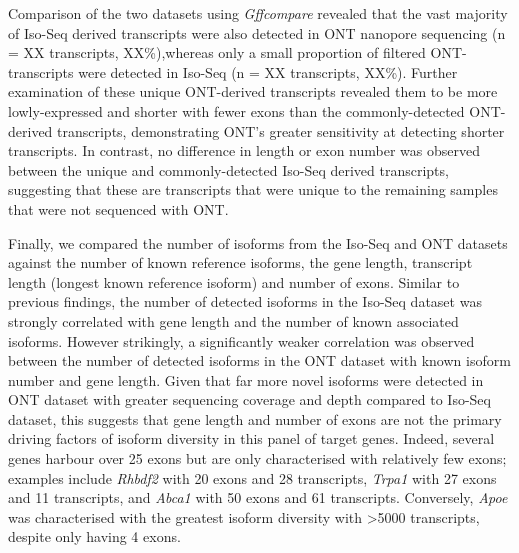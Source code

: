 \begin{figure}[t]
	\captionsetup{width=0.95\textwidth}
\end{figure}

Comparison of the two datasets using \textit{Gffcompare} revealed that the vast majority of Iso-Seq derived transcripts were also detected in ONT nanopore sequencing (n = XX transcripts, XX\%),whereas only a small proportion of filtered ONT-transcripts were detected in Iso-Seq (n = XX transcripts, XX\%). Further examination of these unique ONT-derived transcripts revealed them to be more lowly-expressed and shorter with fewer exons than the commonly-detected ONT-derived transcripts, demonstrating ONT's greater sensitivity at detecting shorter transcripts. In contrast, no difference in length or exon number was observed between the unique and commonly-detected Iso-Seq derived transcripts, suggesting that these are transcripts that were unique to the remaining samples that were not sequenced with ONT. 

Finally, we compared the number of isoforms from the Iso-Seq and ONT datasets against the number of known reference isoforms, the gene length, transcript length (longest known reference isoform) and number of exons. Similar to previous findings, the number of detected isoforms in the Iso-Seq dataset was strongly correlated with gene length and the number of known associated isoforms. However strikingly, a significantly weaker correlation was observed between the number of detected isoforms in the ONT dataset with known isoform number and gene length. Given that far more novel isoforms were detected in ONT dataset with greater sequencing coverage and depth compared to Iso-Seq dataset, this suggests that gene length and number of exons are not the primary driving factors of isoform diversity in this panel of target genes. Indeed, several genes harbour over 25 exons but are only characterised with relatively few exons; examples include \textit{Rhbdf2} with 20 exons and 28 transcripts, \textit{Trpa1} with 27 exons and 11 transcripts, and \textit{Abca1} with 50 exons and 61 transcripts. Conversely, \textit{Apoe} was characterised with the greatest isoform diversity with >5000 transcripts, despite only having 4 exons. 

